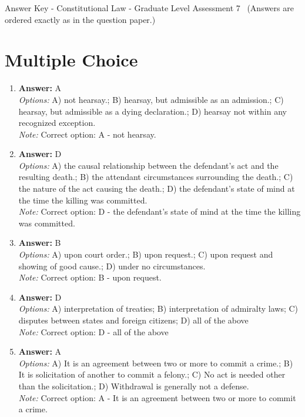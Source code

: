 \documentclass[12pt]{article}
\begin{document}
\begin{center}
Answer Key - Constitutional Law - Graduate Level Assessment 7 \
\small (Answers are ordered exactly as in the question paper.)
\end{center}

\section*{Multiple Choice}
\begin{enumerate}[label=\arabic*.]
\item \textbf{Answer:} A
\\ \textit{Options:} A) not hearsay.; B) hearsay, but admissible as an admission.; C) hearsay, but admissible as a dying declaration.; D) hearsay not within any recognized exception.
\\ \textit{Note:} Correct option: A - not hearsay.
\item \textbf{Answer:} D
\\ \textit{Options:} A) the causal relationship between the defendant's act and the resulting death.; B) the attendant circumstances surrounding the death.; C) the nature of the act causing the death.; D) the defendant's state of mind at the time the killing was committed.
\\ \textit{Note:} Correct option: D - the defendant's state of mind at the time the killing was committed.
\item \textbf{Answer:} B
\\ \textit{Options:} A) upon court order.; B) upon request.; C) upon request and showing of good cause.; D) under no circumstances.
\\ \textit{Note:} Correct option: B - upon request.
\item \textbf{Answer:} D
\\ \textit{Options:} A) interpretation of treaties; B) interpretation of admiralty laws; C) disputes between states and foreign citizens; D) all of the above
\\ \textit{Note:} Correct option: D - all of the above
\item \textbf{Answer:} A
\\ \textit{Options:} A) It is an agreement between two or more to commit a crime.; B) It is solicitation of another to commit a felony.; C) No act is needed other than the solicitation.; D) Withdrawal is generally not a defense.
\\ \textit{Note:} Correct option: A - It is an agreement between two or more to commit a crime.
\end{enumerate}
\end{document}
